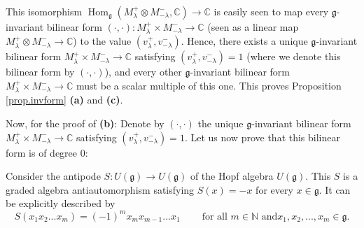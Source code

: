\documentclass[etingof-lie.tex]{subfiles}
\begin{document}
This isomorphism $\operatorname*{Hom}\nolimits_{\mathfrak{g}}\left(
M_{\lambda}^{+}\otimes M_{-\lambda}^{-},\mathbb{C}\right)  \rightarrow
\mathbb{C}$ is easily seen to map every $\mathfrak{g}$-invariant bilinear form
$\left(  \cdot,\cdot\right)  :M_{\lambda}^{+}\times M_{-\lambda}%
^{-}\rightarrow\mathbb{C}$ (seen as a linear map $M_{\lambda}^{+}\otimes
M_{-\lambda}^{-}\rightarrow\mathbb{C}$) to the value $\left(  v_{\lambda}%
^{+},v_{-\lambda}^{-}\right)  $. Hence, there exists a unique $\mathfrak{g}%
$-invariant bilinear form $M_{\lambda}^{+}\times M_{-\lambda}^{-}%
\rightarrow\mathbb{C}$ satisfying $\left(  v_{\lambda}^{+},v_{-\lambda}%
^{-}\right)  =1$ (where we denote this bilinear form by $\left(  \cdot
,\cdot\right)  $), and every other $\mathfrak{g}$-invariant bilinear form
$M_{\lambda}^{+}\times M_{-\lambda}^{-}\rightarrow\mathbb{C}$ must be a scalar
multiple of this one. This proves Proposition \ref{prop.invform} \textbf{(a)}
and \textbf{(c)}.

Now, for the proof of \textbf{(b)}: Denote by $\left(  \cdot,\cdot\right)  $
the unique $\mathfrak{g}$-invariant bilinear form $M_{\lambda}^{+}\times
M_{-\lambda}^{-}\rightarrow\mathbb{C}$ satisfying $\left(  v_{\lambda}%
^{+},v_{-\lambda}^{-}\right)  =1$. Let us now prove that this bilinear form is
of degree $0$:

Consider the antipode $S:U\left(  \mathfrak{g}\right)  \rightarrow U\left(
\mathfrak{g}\right)  $ of the Hopf algebra $U\left(  \mathfrak{g}\right)  $.
This $S$ is a graded algebra antiautomorphism satisfying $S\left(  x\right)
=-x$ for every $x\in\mathfrak{g}$. It can be explicitly described by
\[
S\left(  x_{1}x_{2}...x_{m}\right)  =\left(  -1\right)  ^{m}x_{m}%
x_{m-1}...x_{1}\ \ \ \ \ \ \ \ \ \ \text{for all }m\in\mathbb{N}\text{ and
}x_{1},x_{2},...,x_{m}\in\mathfrak{g}.
\]
\end{document}
